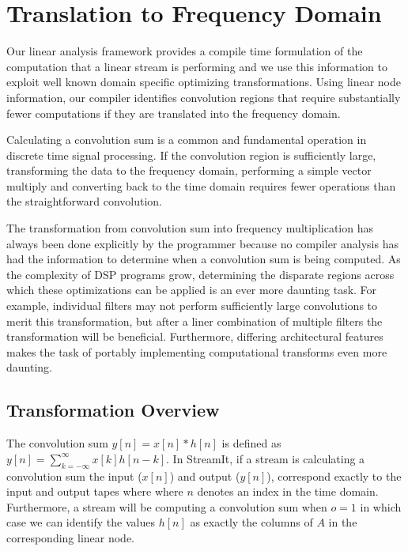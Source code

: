 
\section{Translation to Frequency Domain}
\label{sec:freq}

Our linear analysis framework provides a compile time formulation of
the computation that a linear stream is performing and we
use this information to exploit well known domain specific optimizing
transformations.  Using linear node information, our compiler
identifies convolution regions that require substantially fewer
computations if they are translated into the frequency domain.

Calculating a convolution sum is a common and fundamental operation in
discrete time signal processing.  If the convolution region is
sufficiently large, transforming the data to the frequency domain,
performing a simple vector multiply and converting back to the time
domain requires fewer operations than the straightforward convolution.

The transformation from convolution sum into frequency multiplication
has always been done explicitly by the programmer because no compiler
analysis has had the information to determine when a convolution sum
is being computed.  As the complexity of DSP programs grow,
determining the disparate regions across which these optimizations can
be applied is an ever more daunting task. For example, individual
filters may not perform sufficiently large convolutions to merit this
transformation, but after a liner combination of multiple filters the
transformation will be beneficial.  Furthermore, differing
architectural features makes the task of portably implementing 
computational transforms even more daunting.

\subsection{Transformation Overview}
The convolution sum $y[n]=x[n]*h[n]$ is defined as
$y[n]=\sum_{k=-\infty}^{\infty}x[k]h[n-k]$. In StreamIt, if a 
stream is calculating a convolution sum the input
($x[n]$) and output ($y[n]$), correspond exactly to the input and
output tapes where where $n$ denotes an index in the time domain.  
Furthermore, a stream will be computing a
convolution sum when $o=1$ in which case we can identify the values
$h[n]$ as exactly the columns of $A$ in the corresponding linear node.

